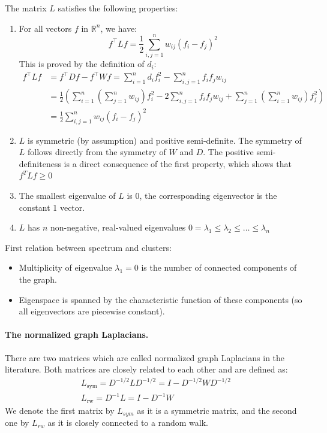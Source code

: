 The matrix $L$ satisfies the following properties:
\begin{enumerate}
	\item For all vectors $f$ in $\mathbb{R}^n$, we have:
	$$f ^ { \top } L f = \frac { 1 } { 2 } \sum _ { i, j = 1 } ^ { n } w _ { i j } \left( f _ { i } - f _ { j } \right) ^ { 2 }$$
	This is proved by the definition of $d_i$:
	$$\begin{aligned} 
	f ^ { \top } L f & = f ^ { \top } D f - f ^ { \top } W f = \sum _ { i=1 }^n d _ { i } f _ { i } ^ { 2 } - \sum _ { i , j =1 }^n f _ { i } f _ { j } w _ { i j } \\ 
	& = \frac { 1 } { 2 } \left( \sum _ { i=1 }^n \left( \sum _ { j=1 }^n w _ { i j } \right) f _ { i } ^ { 2 } - 2 \sum _ { i, j=1 }^n f _ { i } f _ { j } w _ { i j } + \sum _ { j=1 }^n \left( \sum _ { i=1 }^n w _ { i j } \right) f _ { j } ^ { 2 } \right) \\ 
	& = \frac { 1 } { 2 } \sum _ { i ,j=1 }^n w _ { i j } \left( f _ { i } - f _ { j } \right) ^ { 2 } 
	\end{aligned}$$
	 
	\item $L$ is symmetric (by assumption) and positive semi-definite. The symmetry of $L$ follows directly from the symmetry of $W$ and $D$. The positive semi-definiteness is a direct consequence of the first property, which shows that 	$f ^ { T } L f \geq 0$
	 
	\item The smallest eigenvalue of $L$ is 0, the corresponding eigenvector is the constant 1 vector.
	\item $L$ has $n$ non-negative, real-valued eigenvalues $0 = \lambda _ { 1 } \leq \lambda _ { 2 } \leq \ldots \leq \lambda _ { n }$
\end{enumerate}

First relation between spectrum and clusters:
\begin{itemize}
	\item Multiplicity of eigenvalue $\lambda_1=0$ is the number of connected components of the graph.
	\item Eigenspace is spanned by the characteristic function of these components (so all eigenvectors are piecewise constant).
\end{itemize}

\paragraph{The normalized graph Laplacians.} There are two matrices which are called normalized graph Laplacians in the literature. Both matrices are closely related to each other and are defined as:
$$\begin{array} { l } { L _ { \mathrm { sym } } = D ^ { - 1 / 2 } L D ^ { - 1 / 2 } = I - D ^ { - 1 / 2 } W D ^ { - 1 / 2 } } \\ { L _ { \mathrm { rw } } = D ^ { - 1 } L = I - D ^ { - 1 } W } \end{array}$$
We denote the first matrix by $L_{sym}$ as it is a symmetric matrix, and the second one by $L_{rw}$ as it is closely connected to a random walk.
 
